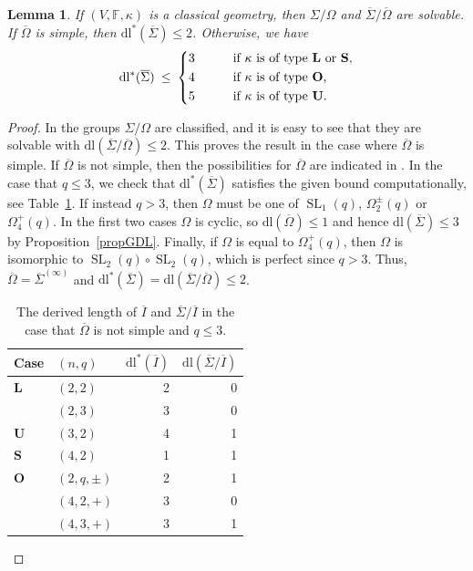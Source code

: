 \documentclass[11pt]{amsart}
\numberwithin{equation}{section}
\newtheorem{lemma}[theorem]{Lemma}
\theoremstyle{definition}
\theoremstyle{remark}
\DeclareMathOperator{\SL}{SL}
\newcommand{\dll}{\mathrm{dl^*}}
\newcommand{\dl}{\mathrm{dl}}
\newcommand{\boldL}{\mathbf{L}}
\newcommand{\boldU}{\mathbf{U}}
\newcommand{\boldS}{\mathbf{S}}
\newcommand{\boldO}{\mathbf{O}}
\begin{document}
\begin{lemma}\label{lemma:dlclassicalgroup}
    If $(V, \mathbb F, \kappa)$ is a classical geometry, then $ \Sigma / \Omega$ and $\overline \Sigma / \overline \Omega$ are solvable.
    If $\overline \Omega$ is simple, then $\dll(\overline \Sigma) \leq 2$. Otherwise, we have
    \[
        \dll( \overline \Sigma ) \> \leq \>
        \begin{cases*}
            3 \qquad & if $\kappa$ is of type $\boldL$ or $\boldS$,\\
            4 & if $\kappa$ is of type $\boldO$,\\
            5 & if $\kappa$ is of type $\boldU$.
        \end{cases*}
    \]
\end{lemma}
\begin{proof}
    In \cite[Ch.~2]{KL90} the groups $ \Sigma /  \Omega$ are classified, and it is easy to see that they are solvable with $\dl(\overline \Sigma/\overline \Omega) \leq 2$. This proves the result in the case where $\overline \Omega$ is simple.
    If $\overline \Omega$ is not simple, then the possibilities for $\overline \Omega$ are indicated in \cite[Prop.~2.9.2]{KL90}. In the case that $q \leq 3$, we check that $\dll(\overline \Sigma)$ satisfies the given bound computationally, see Table~\ref{table:dllnonsimpleomega}. If instead $q > 3$, then $\Omega$ must be one of $\SL_1(q)$, $\Omega_2^{\pm}(q)$ or $\Omega_4^+(q)$. In the first two cases $\Omega$ is cyclic, so $\dl(\overline \Omega) \leq 1$ and hence $\dl(\overline \Sigma) \leq 3$ by Proposition~\ref{propGDL}. Finally, if $\Omega$ is equal to $\Omega_4^+(q)$, then $\Omega$ is isomorphic to $\SL_2(q) \circ \SL_2(q)$, which is perfect since $q > 3$. Thus, $\overline \Omega = \overline \Sigma^{(\infty)}$ and $\dll(\overline \Sigma) = \dl(\overline \Sigma/\overline \Omega) \leq 2$.

    \begin{table}[]
        \centering
        \begin{tabular}{llrr}
            Case & $(n, q)$ & $\dll(\overline I)$ & $\dl(\overline \Sigma / \overline I)$ \\ \toprule
            $\boldL$ & $(2,2)$ & 2 & 0 \\
            & $(2,3)$ & 3 & 0 \\
            $\boldU$ & $(3,2)$ & 4 & 1 \\
            $\boldS$ & $(4,2)$ & 1 & 1 \\
            $\boldO$ & $(2,q,\pm)$ & 2 & 1 \\
            & $(4,2,+)$ & 3 & 0 \\
            & $(4,3,+)$ & 3 & 1 \\ \bottomrule
        \end{tabular}
        \caption{The derived length of $\overline I$ and $\overline \Sigma / \overline I$ in the case that $\overline \Omega$ is not simple and $q \leq 3$.}
        \label{table:dllnonsimpleomega}
    \end{table}
\end{proof}
\end{document}
